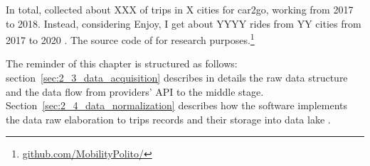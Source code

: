 
In total, \tool collected about XXX of trips in X cities for car2go, working from 2017 to 2018. Instead, considering Enjoy, I get about YYYY rides from YY cities from 2017 to 2020
. The source code of \tool for research purposes.\footnote{\url{github.com/MobilityPolito/}}


The reminder of this chapter is structured as follows: section~\ref{sec:2_3_data_acquisition} describes in details the raw data structure and the data flow from providers' API to the middle stage. Section~\ref{sec:2_4_data_normalization} describes how the software implements the data raw elaboration to trips records and their storage into data lake . 





%




